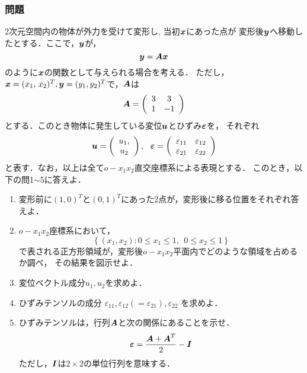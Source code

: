 \documentclass[10pt,a4j]{jarticle}
\begin{document}
\subsubsection*{問題}
2次元空間内の物体が外力を受けて変形し, 当初$\mbox{\boldmath $x$}$にあった点が
変形後$\mbox{\boldmath $y$}$へ移動したとする．ここで，$\mbox{\boldmath $y$}$が，
\begin{equation}
	\mbox{\boldmath $y$}=\mbox{\boldmath $A$}\mbox{\boldmath $x$}
	\label{eqn:disp_fld}
\end{equation}
のように$\mbox{\boldmath $x$}$の関数として与えられる場合を考える．
ただし，$\mbox{\boldmath $x$}=(x_1,\, x_2)^T, \mbox{\boldmath $y$}=(y_1, y_2)^T$で，$\mbox{\boldmath $A$}$は
\begin{equation}
	\mbox{\boldmath $A$}=
	\left(
	\begin{array}{cc}
		 3 & 3 \\
	 	 1 & -1 
	\end{array}
	\label{eqn:Amat}
	\right)
\end{equation}
とする．このとき物体に発生している変位$\mbox{\boldmath $u$}$とひずみ$\mbox{\boldmath $\varepsilon$}$を，
それぞれ
\begin{equation}
	\fat{u}=\left( 
	\begin{array}{c}
	u_1,\\
	u_2 
	\end{array}
	\right)
	, \ \ 
	\fat{\varepsilon}
	=
	\left(
	\begin{array}{cc}
		\varepsilon_{11} & \varepsilon_{12} \\
		\varepsilon_{21} & \varepsilon_{22} 
	\end{array}
	\right)
\end{equation}
と表す．なお，以上は全て$o-x_1x_2$直交座標系による表現とする．
このとき，以下の問1$\sim$5に答えよ．
\begin{enumerate}
\item
	変形前に$(1,0)^T$と$(0,1)^T$にあった2点が，変形後に移る位置をそれぞれ答えよ．
\item
	$o-x_1x_2$座標系において，
	\[
		\left\{ (x_1,x_2):
		0\leq x_1 \leq 1, 
		\ \
		0\leq x_2 \leq 1
		\right\}
	\]
	で表される正方形領域が，変形後$o-x_1x_2$平面内でどのような領域を占めるか調べ，
	その結果を図示せよ．
\item
	変位ベクトル成分$u_1,u_2$を求めよ．
\item
	ひずみテンソルの成分
	$\varepsilon_{11},\varepsilon_{12}(=\varepsilon_{21}), \varepsilon_{22}$
	を求めよ．
\item
	ひずみテンソルは，行列$\mbox{\boldmath $A$}$と次の関係にあることを示せ．
	\begin{equation}
		\mbox{\boldmath $\varepsilon$}=\frac{\mbox{\boldmath $A$}+\mbox{\boldmath $A$}^T}{2}-\mbox{\boldmath $I$}
		\label{eqn:def_eps}
	\end{equation}
	ただし，$\mbox{\boldmath $I$}$は$2\times 2$の単位行列を意味する．
\end{enumerate}
\end{document}
